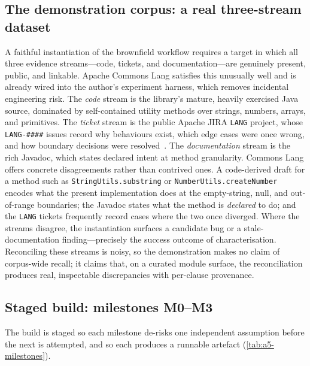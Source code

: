 \subsection{The demonstration corpus: a real three-stream dataset}\label{subsec:a5-corpus}

A faithful instantiation of the brownfield workflow requires a target in which all three evidence streams---code, tickets, and documentation---are genuinely present, public, and linkable. Apache Commons Lang satisfies this unusually well and is already wired into the author's experiment harness, which removes incidental engineering risk. The \emph{code} stream is the library's mature, heavily exercised Java source, dominated by self-contained utility methods over strings, numbers, arrays, and primitives. The \emph{ticket} stream is the public Apache JIRA \texttt{LANG} project, whose \texttt{LANG-\#\#\#\#} issues record why behaviours exist, which edge cases were once wrong, and how boundary decisions were resolved~\cite{merten2015issuetracking,montgomery2022jira}. The \emph{documentation} stream is the rich Javadoc, which states declared intent at method granularity. Commons Lang offers concrete disagreements rather than contrived ones. A code-derived draft for a method such as \texttt{StringUtils.substring} or \texttt{NumberUtils.createNumber} encodes what the present implementation does at the empty-string, null, and out-of-range boundaries; the Javadoc states what the method is \emph{declared} to do; and the \texttt{LANG} tickets frequently record cases where the two once diverged. Where the streams disagree, the instantiation surfaces a candidate bug or a stale-documentation finding---precisely the success outcome of characterisation. Reconciling these streams is noisy, so the demonstration makes no claim of corpus-wide recall; it claims that, on a curated module surface, the reconciliation produces real, inspectable discrepancies with per-clause provenance.

\subsection{Staged build: milestones M0--M3}\label{subsec:a5-milestones}

The build is staged so each milestone de-risks one independent assumption before the next is attempted, and so each produces a runnable artefact (\cref{tab:a5-milestones}).

